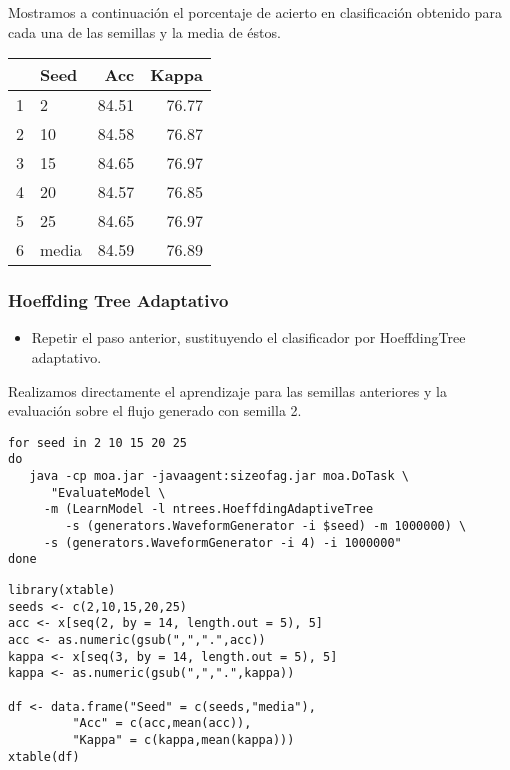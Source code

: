 \documentclass[11pt]{article}
\begin{document}
Mostramos a continuación el porcentaje de acierto en clasificación
obtenido para cada una de las semillas y la media de éstos.
\begin{table}[ht]
\centering
\begin{tabular}{rlrr}
  \hline
 & Seed & Acc & Kappa \\ 
  \hline
1 & 2 & 84.51 & 76.77 \\ 
  2 & 10 & 84.58 & 76.87 \\ 
  3 & 15 & 84.65 & 76.97 \\ 
  4 & 20 & 84.57 & 76.85 \\ 
  5 & 25 & 84.65 & 76.97 \\ 
  6 & media & 84.59 & 76.89 \\ 
   \hline
\end{tabular}
\end{table}

\subsubsection{Hoeffding Tree Adaptativo}
\label{sec:org49f8971}
\begin{itemize}
\item Repetir el paso anterior, sustituyendo el clasificador por
HoeffdingTree adaptativo.
\end{itemize}

Realizamos directamente el aprendizaje para las semillas anteriores y
la evaluación sobre el flujo generado con semilla 2.

\begin{verbatim}
for seed in 2 10 15 20 25
do
   java -cp moa.jar -javaagent:sizeofag.jar moa.DoTask \
      "EvaluateModel \
	 -m (LearnModel -l ntrees.HoeffdingAdaptiveTree
	    -s (generators.WaveformGenerator -i $seed) -m 1000000) \
	 -s (generators.WaveformGenerator -i 4) -i 1000000"
done
\end{verbatim}

\begin{verbatim}
library(xtable)
seeds <- c(2,10,15,20,25)
acc <- x[seq(2, by = 14, length.out = 5), 5]
acc <- as.numeric(gsub(",",".",acc))
kappa <- x[seq(3, by = 14, length.out = 5), 5]
kappa <- as.numeric(gsub(",",".",kappa))

df <- data.frame("Seed" = c(seeds,"media"), 
		 "Acc" = c(acc,mean(acc)),
		 "Kappa" = c(kappa,mean(kappa)))
xtable(df)
\end{verbatim}
\end{document}
